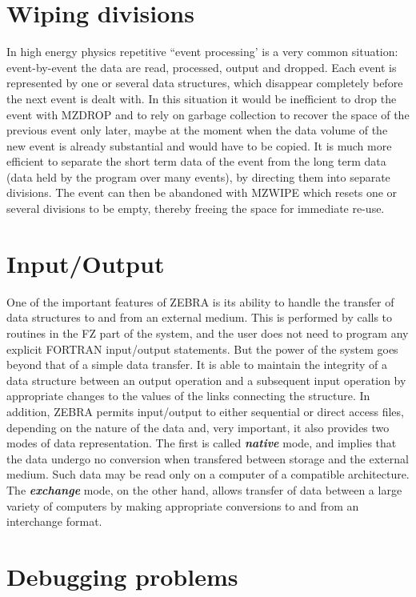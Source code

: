 \section{Wiping divisions}
\par In high energy physics repetitive ``event processing'
is a very common
situation: event-by-event the data are read, processed, output and
dropped. Each event is represented by one or several data structures,
which disappear completely before the next event is dealt with.
In this situation it would be inefficient to drop the event with MZDROP
and to rely on garbage collection to recover the space of the previous
event only later, maybe at the moment when the data volume of the new
event is already substantial and would have to be copied. It is much
more efficient to separate the short term data of the event from the
long term data (data held by the program over many events), by
directing them into separate divisions. The event can then be
abandoned with MZWIPE which resets one or several divisions to be empty,
thereby freeing the space for immediate re-use.
\section{Input/Output}
\par One of the important features of ZEBRA is its ability to handle the
transfer of data structures to and from an external
medium. This is performed by calls to routines in the FZ part of the
system, and the user does not need to program any explicit FORTRAN input/output
statements. But the power of the system goes beyond that of a simple data
transfer. It is able to maintain the integrity of a data structure
between an output operation and a subsequent input operation by
appropriate changes to the values of the links connecting the
structure. In addition, ZEBRA permits
input/output to either sequential or direct access files, depending on the
nature
of the data and, very important, it also provides two modes of data
representation. The first is called
{\bf\it native} mode, and implies that the data undergo no conversion when
transfered between storage and the external medium. Such data may be read
only on a computer of a compatible architecture. The
{\bf\it exchange} mode, on the other hand,
allows transfer of data between a large variety of
computers by making appropriate conversions to and from an interchange
format.
\section{Debugging problems}
